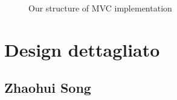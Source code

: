 \documentclass[a4paper,12pt]{report}
\begin{document}
\begin{figure}[H]
	\centering{}
	\caption{Our structure of MVC implementation}
	\label{img:MVC}
	\end{figure}



\section{Design dettagliato}

\subsection{Zhaohui Song}
\end{document}
